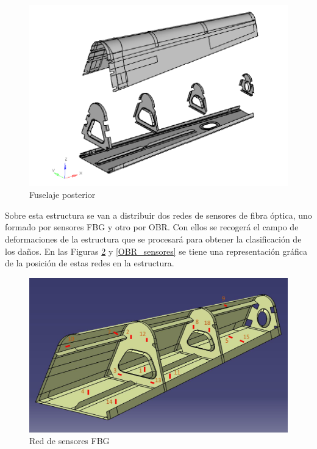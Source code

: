 \begin{figure}[ht!]
    \centering
    \includegraphics[width=130mm]{3/Fotos/estructura_fuselaje.png}
    \captionsetup{justification=centering,margin=1.25cm}
    \caption{Fuselaje posterior}
    \label{estructura_fuselaje}
\end{figure}

Sobre esta estructura se van a distribuir dos redes de sensores de fibra óptica, uno formado por sensores FBG y otro por OBR. Con ellos se recogerá el campo de deformaciones de la estructura que se procesará para obtener la clasificación de los daños. En las Figuras \ref{FBG_sensores} y \ref{OBR_sensores} se tiene una representación gráfica de la posición de estas redes en la estructura.

\begin{figure}[ht]
    \centering
    \includegraphics[width=125mm]{3/Fotos/FBG.png}
    \captionsetup{justification=centering,margin=1.25cm}
    \caption{Red de sensores FBG}
    \label{FBG_sensores}
\end{figure}


